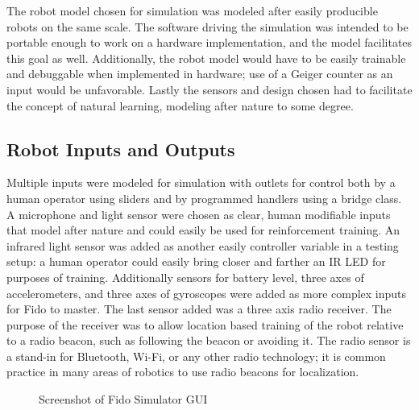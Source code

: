 The robot model chosen for simulation was modeled after easily producible robots on the same scale.  The software driving the simulation was intended to be portable enough to work on a hardware implementation, and the model facilitates this goal as well.  Additionally, the robot model would have to be easily trainable and debuggable when implemented in hardware; use of a Geiger counter as an input would be unfavorable.  Lastly the sensors and design chosen had to facilitate the concept of natural learning, modeling after nature to some degree.

\subsection{Robot Inputs and Outputs}

Multiple inputs were modeled for simulation with outlets for control both by a human operator using sliders and by programmed handlers using a bridge class.  A microphone and light sensor were chosen as clear, human modifiable inputs that model after nature and could easily be used for reinforcement training.  An infrared light sensor was added as another easily controller variable in a testing setup: a human operator could easily bring closer and farther an IR LED for purposes of training.   Additionally sensors for battery level, three axes of accelerometers, and three axes of gyroscopes were added as more complex inputs for Fido to master.  The last sensor added was a three axis radio receiver.  The purpose of the receiver was to allow location based training of the robot relative to a radio beacon, such as following the beacon or avoiding it.  The radio sensor is a stand-in for Bluetooth, Wi-Fi, or any other radio technology; it is common practice in many areas of robotics to use radio beacons for localization.

\begin{figure}
	\centering
	\caption{Screenshot of Fido Simulator GUI}
\end{figure}


